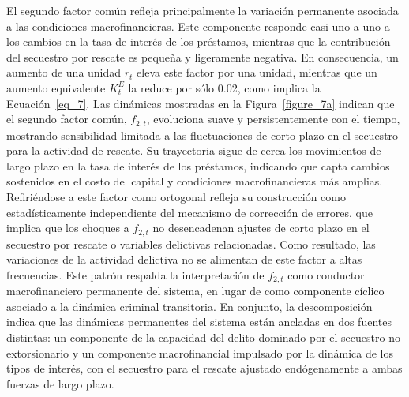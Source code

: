 \documentclass[12pt]{article}
\theoremstyle{definition}
\theoremstyle{remark}
\newcommand{\1}{\mathbf{1}}
\begin{document}
El segundo factor común refleja principalmente la variación permanente asociada a las condiciones macrofinancieras. Este componente responde casi uno a uno a los cambios en la tasa de interés de los préstamos, mientras que la contribución del secuestro por rescate es pequeña y ligeramente negativa. En consecuencia, un aumento de una unidad \(r_t\) eleva este factor por una unidad, mientras que un aumento equivalente \(K^{E}_t\) la reduce por sólo 0.02, como implica la Ecuación~\ref{eq_7}. Las dinámicas mostradas en la Figura~\ref{figure_7a} indican que el segundo factor común, \(f_{2,t}\), evoluciona suave y persistentemente con el tiempo, mostrando sensibilidad limitada a las fluctuaciones de corto plazo en el secuestro para la actividad de rescate. Su trayectoria sigue de cerca los movimientos de largo plazo en la tasa de interés de los préstamos, indicando que capta cambios sostenidos en el costo del capital y condiciones macrofinancieras más amplias. Refiriéndose a este factor como ortogonal refleja su construcción como estadísticamente independiente del mecanismo de corrección de errores, que implica que los choques a \(f_{2,t}\) no desencadenan ajustes de corto plazo en el secuestro por rescate o variables delictivas relacionadas. Como resultado, las variaciones de la actividad delictiva no se alimentan de este factor a altas frecuencias. Este patrón respalda la interpretación de \(f_{2,t}\) como conductor macrofinanciero permanente del sistema, en lugar de como componente cíclico asociado a la dinámica criminal transitoria. En conjunto, la descomposición indica que las dinámicas permanentes del sistema están ancladas en dos fuentes distintas: un componente de la capacidad del delito dominado por el secuestro no extorsionario y un componente macrofinancial impulsado por la dinámica de los tipos de interés, con el secuestro para el rescate ajustado endógenamente a ambas fuerzas de largo plazo.
\end{document}
